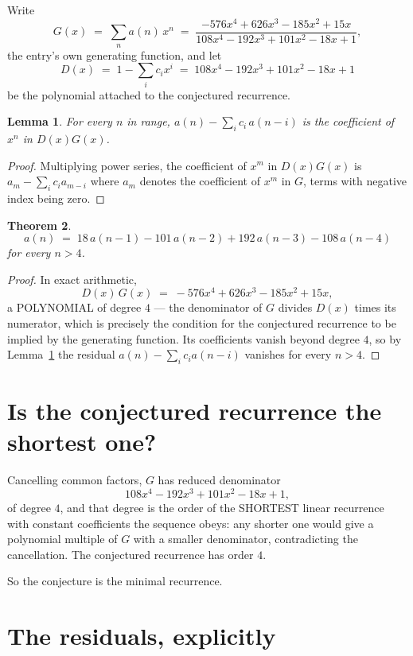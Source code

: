 \documentclass[11pt,a4paper]{article}
\theoremstyle{plain}
\newtheorem{theorem}{Theorem}
\newtheorem{lemma}[theorem]{Lemma}
\theoremstyle{definition}
\begin{document}
Write
\[
G(x)\;=\;\sum_{n}a(n)\,x^{n}\;=\;\frac{- 576 x^{4} + 626 x^{3} - 185 x^{2} + 15 x}{108 x^{4} - 192 x^{3} + 101 x^{2} - 18 x + 1},
\]
the entry's own generating function, and let
\[
D(x)\;=\;1-\sum_i c_i x^{i}\;=\;108 x^{4} - 192 x^{3} + 101 x^{2} - 18 x + 1
\]
be the polynomial attached to the conjectured recurrence.

\begin{lemma}\label{lem:key}
For every $n$ in range, $a(n)-\sum_i c_i\,a(n-i)$ is the coefficient of $x^{n}$ in
$D(x)G(x)$.
\end{lemma}

\begin{proof}
Multiplying power series, the coefficient of $x^{m}$ in $D(x)G(x)$ is
$a_m-\sum_i c_i a_{m-i}$ where $a_m$ denotes the coefficient of $x^{m}$ in $G$, terms with
negative index being zero.
\end{proof}

\begin{theorem}
\[
a(n)\;=\;18\,a(n-1) - 101\,a(n-2) + 192\,a(n-3) - 108\,a(n-4)
\]
for every $n>4$.
\end{theorem}

\begin{proof}
In exact arithmetic,
\[
D(x)\,G(x)\;=\;- 576 x^{4} + 626 x^{3} - 185 x^{2} + 15 x,
\]
a POLYNOMIAL of degree $4$ --- the denominator of $G$ divides $D(x)$ times its numerator,
which is precisely the condition for the conjectured recurrence to be implied by the
generating function. Its coefficients vanish beyond degree $4$, so by
Lemma~\ref{lem:key} the residual $a(n)-\sum_ic_ia(n-i)$ vanishes for every
$n>4$.
\end{proof}

\section{Is the conjectured recurrence the shortest one?}

Cancelling common factors, $G$ has reduced denominator
\[
108 x^{4} - 192 x^{3} + 101 x^{2} - 18 x + 1,
\]
of degree $4$, and that degree is the order of the SHORTEST linear recurrence with
constant coefficients the sequence obeys: any shorter one would give a polynomial multiple of
$G$ with a smaller denominator, contradicting the cancellation. The conjectured recurrence has
order $4$.

So the conjecture is the minimal recurrence.

\section{The residuals, explicitly}
\end{document}
